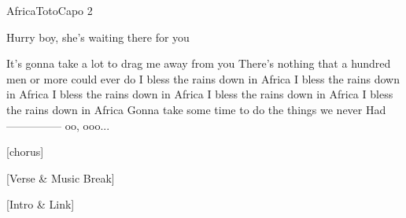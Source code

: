 \begin{song}{Africa}{Toto}{Capo 2}

Hurry boy, she's waiting there for you

It's gonna take a lot to drag me away from you
There's nothing that a hundred men or more could ever do
I bless the rains down in Africa
I bless the rains down in Africa
I bless the rains down in Africa
I bless the rains down in Africa
I bless the rains down in Africa
Gonna take some time to do the things we never
Had--------------- oo, ooo...

[chorus]



[Verse & Music Break]


[Intro & Link]
\end{song}